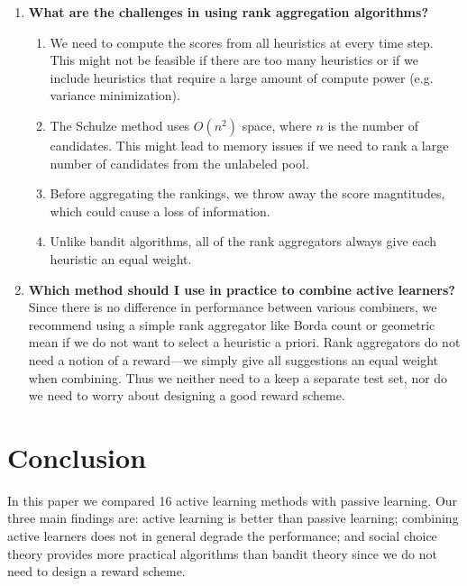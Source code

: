 \documentclass[fleqn,10pt,lineno]{wlpeerj} %
\begin{document}
\begin{enumerate}
	\item \textbf{What are the challenges in using rank aggregation
	algorithms?}
	\begin{enumerate}
		\item We need to compute the scores from all heuristics at every time
		step. This might not be feasible if there are too many heuristics or if
		we include heuristics that require a large amount of compute power
		(e.g. variance minimization).
		\item The Schulze method uses $O(n^2)$ space, where $n$ is the number
		of candidates. This might lead to memory issues if we need to rank
		a large number of candidates from the unlabeled pool.
		\item Before aggregating the rankings, we throw away the score
		magntitudes, which could cause a loss of information.
		\item Unlike bandit algorithms, all of the rank aggregators always give
		each heuristic an equal weight.
	\end{enumerate}

	\item \textbf{Which method should I use in practice to combine active
	learners?} Since there is no difference in performance between various
	combiners,  we recommend using a simple rank aggregator like Borda count or
	geometric mean if we do not want to select a heuristic a priori. Rank
	aggregators do not need a notion of a reward---we simply give all
	suggestions an equal weight when combining. Thus we neither need to a keep
	a separate test set, nor do we need to worry about designing a good reward
	scheme.
\end{enumerate}

\section{Conclusion}

In this paper we compared 16 active learning methods with passive learning.
Our three main findings are: active learning is better than passive learning;
combining active learners does not in general degrade the performance; and
social choice theory provides more practical algorithms than bandit theory
since we do not need to design a reward scheme.
\end{document}
